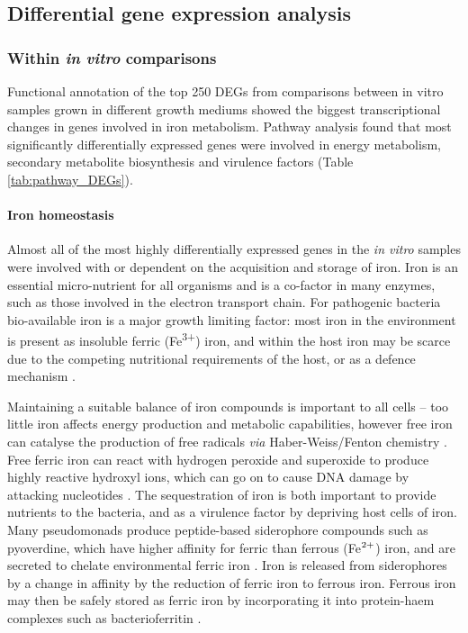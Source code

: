 \subsection{Differential gene expression analysis}

\subsubsection{Within \textit{in vitro} comparisons}

Functional annotation of the top 250 DEGs from comparisons between in vitro samples grown in different growth mediums showed the biggest transcriptional changes in genes involved in iron metabolism. Pathway analysis found that most significantly differentially expressed genes were involved in energy metabolism, secondary metabolite biosynthesis and virulence factors (Table \ref{tab:pathway_DEGs}).

\paragraph{Iron homeostasis}

Almost all of the most highly differentially expressed genes in the \textit{in vitro} samples were involved with or dependent on the acquisition and storage of iron. Iron is an essential micro-nutrient for all organisms and is a co-factor in many enzymes, such as those involved in the electron transport chain. For pathogenic bacteria bio-available iron is a major growth limiting factor: most iron in the environment is present as insoluble ferric (Fe\textsuperscript{3+}) iron, and within the host iron may be scarce due to the competing nutritional requirements of the host, or as a defence mechanism \citep{Ratledge2000-qn}. 

Maintaining a suitable balance of iron compounds is important to all cells -- too little iron affects energy production and metabolic capabilities, however free iron can catalyse the production of free radicals \textit{via} Haber-Weiss/Fenton chemistry \citep{Fones2013-vp}. Free ferric iron can react with hydrogen peroxide and superoxide to produce highly reactive hydroxyl ions, which can go on to cause DNA damage by attacking nucleotides \citep{Kehrer2000-ka}. The sequestration of iron is both important to provide nutrients to the bacteria, and as a virulence factor by depriving host cells of iron. Many pseudomonads produce peptide-based siderophore compounds such as pyoverdine, which have higher affinity for ferric than ferrous (Fe$\textsuperscript{2+}$) iron, and are secreted to chelate environmental ferric iron \citep{Cezard2015-ji}. Iron is released from siderophores by a change in affinity by the reduction of ferric iron to ferrous iron. Ferrous iron may then be safely stored as ferric iron by incorporating it into protein-haem complexes such as bacterioferritin \citep{Ratledge2000-qn}.

